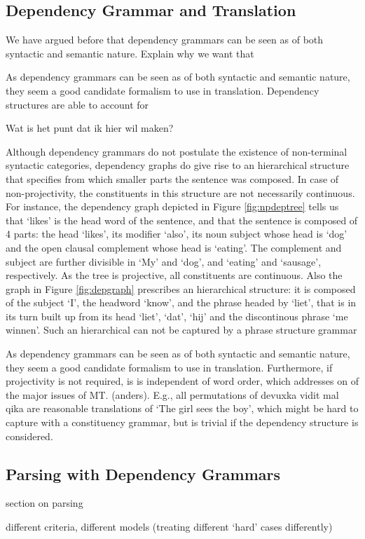 \documentclass{report}
\newcommand\textcyr[1]{{\fontencoding{OT2}\fontfamily{wncyr}\selectfont #1}}
\theoremstyle{definition}
\theoremstyle{plain}
\begin{document}
\subsection{Dependency Grammar and Translation}
\label{sec:deptrans}

We have argued before that dependency grammars can be seen as of both syntactic and semantic nature.
Explain why we want that

As dependency grammars can be seen as of both syntactic and semantic nature, they seem a good candidate formalism to use in translation. Dependency structures are able to account for 

Wat is het punt dat ik hier wil maken? 

Although dependency grammars do not postulate the existence of non-terminal syntactic categories, dependency graphs do give rise to an hierarchical structure that specifies from which smaller parts the sentence was composed. In case of non-projectivity, the constituents in this structure are not necessarily continuous. For instance, the dependency graph depicted in Figure \ref{fig:npdeptree} tells us that `likes' is the head word of the sentence, and that the sentence is composed of 4 parts: the head `likes', its modifier `also', its noun subject whose head is `dog' and the open clausal complement whose head is `eating'. The complement and subject are further divisible in `My' and `dog', and `eating' and `sausage', respectively. As the tree is projective, all constituents are continuous. Also the graph in Figure \ref{fig:depgraph} prescribes an hierarchical structure: it is composed of the subject `I', the headword `know', and the phrase headed by `liet', that is in its turn built up from its head `liet', `dat', `hij' and the discontinous phrase `me winnen'. Such an hierarchical can not be captured by a phrase structure grammar






As dependency grammars can be seen as of both syntactic and semantic nature, they seem a good candidate formalism to use in translation. Furthermore, if projectivity is not required, is is independent of word order, which addresses on of the major issues of MT. (anders). E.g., all permutations of \textcyr{devuxka vidit mal qika} are reasonable translations of `The girl sees the boy', which might be hard to capture with a constituency grammar, but is trivial if the dependency structure is considered.


\subsection{Parsing with Dependency Grammars}

section on parsing





different criteria, different models (treating different `hard' cases differently)



\end{document}
